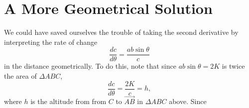 \documentclass{ximera}
\begin{document}
\section*{A More Geometrical Solution}
We could have saved ourselves the trouble of taking the second derivative by interpreting the rate of change
\[
    \frac{dc}{d\theta} = \frac{ab\sin \theta}{c} 
\]
in the distance geometrically. To do this, note that since $ab\sin\theta = 2K$ is twice the area of $\Delta ABC$,
\[
      \frac{dc}{d\theta} = \frac{2K}{c}  = h,
\]
where $h$ is the altitude from from $C$ to $\overrightarrow{AB}$ in $\Delta ABC$ above. Since 
\end{document}
